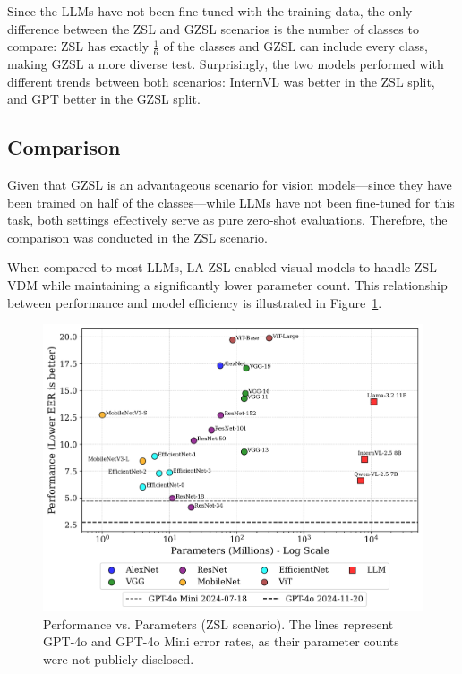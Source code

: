 Since the \glspl{LLM} have not been fine-tuned with the training data, the only difference between the \gls{ZSL} and \gls{GZSL} scenarios is the number of classes to compare: \gls{ZSL} has exactly $\tfrac{1}{6}$ of the classes and \gls{GZSL} can include every class, making \gls{GZSL} a more diverse test. Surprisingly, the two models performed with different trends between both scenarios: InternVL was better in the \gls{ZSL} split, and GPT better in the \gls{GZSL} split.

\subsection{Comparison}
\label{sec:comparison_result}

Given that \gls{GZSL} is an advantageous scenario for vision models—since they have been trained on half of the classes—while \glspl{LLM} have not been fine-tuned for this task, both settings effectively serve as pure zero-shot evaluations. Therefore, the comparison was conducted in the \gls{ZSL} scenario.

When compared to most \glspl{LLM}, \gls{LA-ZSL} enabled visual models to handle \gls{ZSL} \gls{VDM} while maintaining a significantly lower parameter count. This relationship between performance and model efficiency is illustrated in Figure~\ref{fig:performance}.

\begin{figure}[htbp]
\centering
\includegraphics[width=1\linewidth]{images/performance_vs_parameters.png}
\caption{Performance vs. Parameters (\acrlong{ZSL} scenario)\label{fig:performance}. The lines represent GPT-4o and GPT-4o Mini error rates, as their parameter counts were not publicly disclosed.}
\end{figure}  

